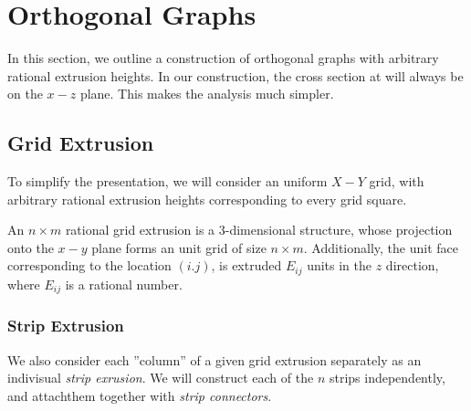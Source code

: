 \section{Orthogonal Graphs}
\label{sec:orthogonal_graphs}

In this section, we outline a construction of orthogonal graphs with arbitrary rational extrusion heights.
In our construction, the cross section at will always be on the $x-z$ plane.
This makes the analysis much simpler.

\subsection{Grid Extrusion}
\label{sec:grid_extrusion}

To simplify the presentation, we will consider an uniform $X-Y$ grid,
with arbitrary rational extrusion heights corresponding to every grid square.
\begin{definition}
An $n\times m$ rational grid extrusion is a 3-dimensional structure,
whose projection onto the $x-y$ plane forms an unit grid of size $n\times m$.
Additionally, the unit face corresponding to the location $(i.j)$,
is extruded $E_{ij}$ units in the $z$ direction, where $E_{ij}$ is a rational number.
\end{definition}

\subsubsection{Strip Extrusion}
\label{sec:strip_extrusion}
We also consider each ''column'' of a given grid extrusion separately as an indivisual \emph{strip exrusion}.
We will construct each of the $n$ strips independently, and attachthem together with \emph{strip connectors}.



